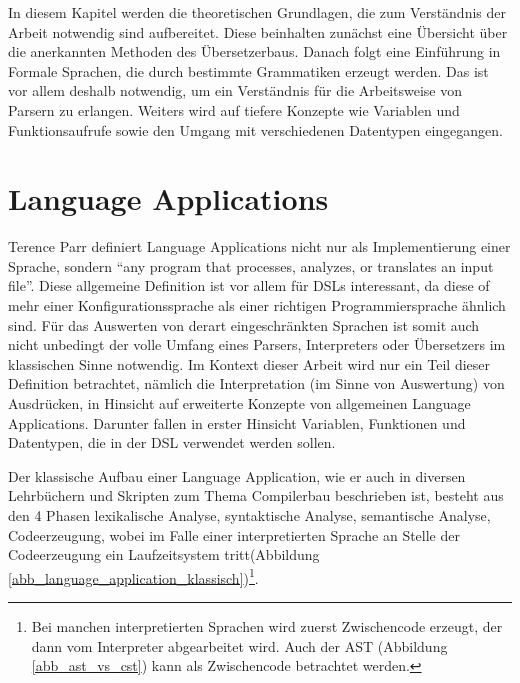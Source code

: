 \label{chapter_theoretische_grundlagen}

In diesem Kapitel werden die theoretischen Grundlagen, die zum Verständnis der Arbeit not\-wen\-dig sind aufbereitet. Diese beinhalten zunächst eine Über\-sicht über die anerkannten Methoden des Übersetzerbaus. Danach folgt eine Ein\-füh\-rung in Formale Sprachen, die durch bestimmte Grammatiken erzeugt werden. Das ist vor allem deshalb not\-wen\-dig, um ein Verständnis für die Arbeitsweise von Parsern zu erlangen. Weiters wird auf tiefere Konzepte wie Variablen und Funktionsaufrufe sowie den Umgang mit verschiedenen Datentypen eingegangen.


\section{Language Applications}
\label{theorie_language_applications}

Terence Parr definiert Language Applications nicht nur als Implementierung einer Sprache, sondern ``any program that processes, analyzes, or translates an input file''\cite{Parr10}. Diese allgemeine Definition ist vor allem für DSLs interessant, da diese of mehr  einer Konfigurationssprache als einer richtigen Programmiersprache ähnlich sind. Für das Auswerten von derart ein\-ge\-schränk\-ten Sprachen ist somit auch nicht unbedingt der volle Umfang eines Parsers, Interpreters oder Übersetzers im klassischen Sinne not\-wen\-dig. Im Kontext dieser Arbeit wird nur ein Teil dieser Definition betrachtet, nämlich die Interpretation (im Sinne von Auswertung) von Ausdrücken, in Hinsicht auf erweiterte Konzepte von allgemeinen Language Applications. Darunter fallen in erster Hinsicht Variablen, Funktionen und Datentypen, die in der DSL verwendet werden sollen.

Der klassische Aufbau einer Language Application, wie er auch in diversen Lehrbüchern und Skripten zum Thema Compilerbau beschrieben ist, besteht aus den 4 Phasen lexikalische Analyse, syntaktische Analyse, semantische Analyse, Codeerzeugung, wobei im Falle einer interpretierten Sprache an Stelle der Codeerzeugung ein Laufzeitsystem tritt(Abbildung \ref{abb_language_application_klassisch})\footnote{Bei manchen interpretierten Sprachen wird zuerst Zwischencode erzeugt, der dann vom Interpreter abgearbeitet wird. Auch der AST (Abbildung \ref{abb_ast_vs_cst}) kann als Zwischencode betrachtet werden.}.


